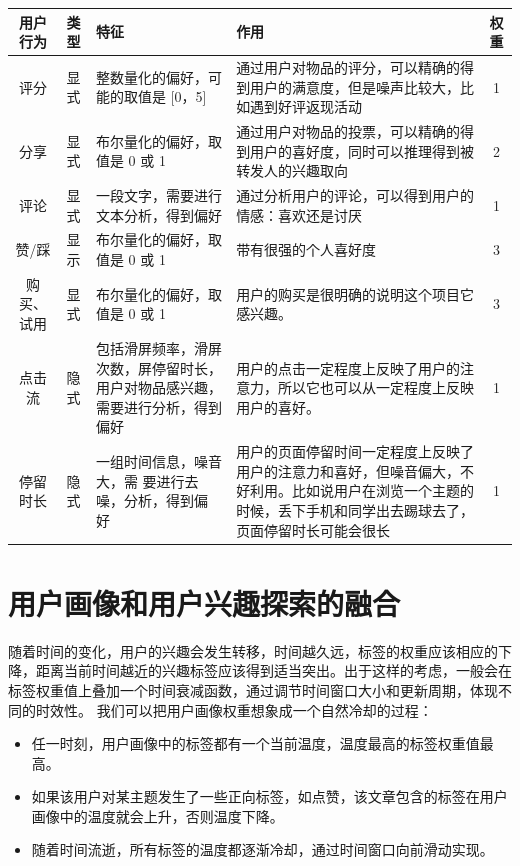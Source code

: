     \begin{table}[htp]
    \centering
    \label{tab:userAction}
    \begin{tabular}{ |c|c|p{4cm}|p{5cm}|c|} \hline
     用户行为 & 类型 & 特征 & 作用 & 权重\\ \hline
     评分 & 显式 & 整数量化的偏好，可能的取值是 [0，5] & 通过用户对物品的评分，可以精确的得到用户的满意度，但是噪声比较大，比如遇到好评返现活动 & 1\\ \hline
     分享 & 显式 & 布尔量化的偏好，取值是 0 或 1 & 通过用户对物品的投票，可以精确的得到用户的喜好度，同时可以推理得到被转发人的兴趣取向 & 2\\ \hline
     评论 & 显式 & 一段文字，需要进行文本分析，得到偏好 & 通过分析用户的评论，可以得到用户的情感：喜欢还是讨厌 & 1\\ \hline
     赞/踩 & 显示 & 布尔量化的偏好，取值是 0 或 1 & 带有很强的个人喜好度 & 3 \\ \hline
     购买、试用 & 显式 & 布尔量化的偏好，取值是 0 或 1 & 用户的购买是很明确的说明这个项目它感兴趣。& 3 \\ \hline
     点击流 & 隐式 & 包括滑屏频率，滑屏次数，屏停留时长，用户对物品感兴趣，需要进行分析，得到偏好 & 用户的点击一定程度上反映了用户的注意力，所以它也可以从一定程度上反映用户的喜好。& 1 \\ \hline
     停留时长 & 隐式 & 一组时间信息，噪音大，需 要进行去噪，分析，得到偏 好 & 用户的页面停留时间一定程度上反映了用户的注意力和喜好，但噪音偏大，不好利用。比如说用户在浏览一个主题的时候，丢下手机和同学出去踢球去了，页面停留时长可能会很长 & 1 \\ \hline
    \end{tabular}
    \end{table}

  \section{用户画像和用户兴趣探索的融合}
  随着时间的变化，用户的兴趣会发生转移，时间越久远，标签的权重应该相应的下降，距离当前时间越近的兴趣标签应该得到适当突出。出于这样的考虑，一般会在标签权重值上叠加一个时间衰减函数，通过调节时间窗口大小和更新周期，体现不同的时效性。
  我们可以把用户画像权重想象成一个自然冷却的过程：
  \begin{itemize}
    \item 任一时刻，用户画像中的标签都有一个当前温度，温度最高的标签权重值最高。
    \item 如果该用户对某主题发生了一些正向标签，如点赞，该文章包含的标签在用户画像中的温度就会上升，否则温度下降。
    \item 随着时间流逝，所有标签的温度都逐渐冷却，通过时间窗口向前滑动实现。
  \end{itemize}

